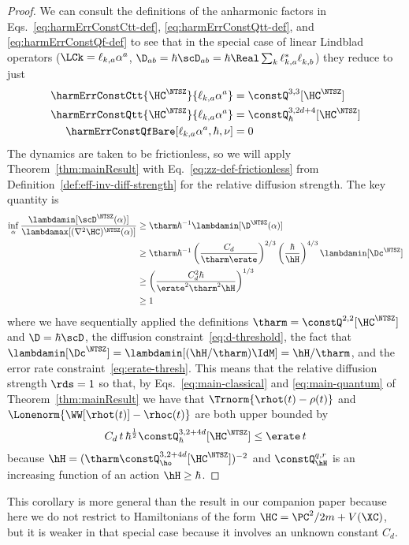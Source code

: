 \documentclass{article}
\numberwithin{equation}{section}
\begin{document}
\begin{proof}
    We can consult the definitions of the anharmonic factors in Eqs.~\eqref{eq:harmErrConstCtt-def}, \eqref{eq:harmErrConstQtt-def}, and \eqref{eq:harmErrConstQf-def} to see that in the special case of linear Lindblad operators ($\LCk = \ell_{k,a}\alpha^a$, $\D_{ab} =\hbar\scD_{ab}=  \hbar\Real \sum_k {\ell_{k,a}^*}{ \ell_{k,b}^{\phantom *}}$) they reduce to 
    just 
    \begin{align}
        \harmErrConstCtt{\HC^\NTSZ}{\ell_{k,a}\alpha^a} 
        &= 
         \constQ^{3,3}[\HC^\NTSZ]
        \\
        \harmErrConstQtt{\HC^\NTSZ}{\ell_{k,a}\alpha^a} 
        &= 
        \constQ^{3,2d+4}_\hbar[\HC^\NTSZ]
        \\
        \harmErrConstQfBare[\ell_{k,a}\alpha^a,\hbar,\nu] &= 
        0
    \end{align}
    The dynamics are taken to be frictionless, so we will apply Theorem~\ref{thm:mainResult} with 
    Eq.~\eqref{eq:zz-def-frictionless} from Definition~\ref{def:eff-inv-diff-strength} for the relative diffusion strength.  The key quantity is
    \begin{align}
        \inf_\alpha 
        \frac{\lambdamin[\scD^\NTSZ(\alpha)]}{\lambdamax[(\nabla^2\HC)^\NTSZ(\alpha)]}
        & \ge 
        \tharm \hbar^{-1} \lambdamin[\D^\NTSZ(\alpha)]
        \\
        \label{johnny1}
        & \ge 
        \tharm \hbar^{-1} \left(\frac{C_d}{\tharm\erate}\right)^{2/3}
        \left(\frac{\hbar}{\hH}\right)^{4/3} \lambdamin[\Dc^\NTSZ]
        \\
        \label{johnny3}
        & \ge 
        \left(\frac{C_d^2\hbar}{\erate^2 \tharm^2\hH}\right)^{1/3} \\
        \label{johnny4}
        & \ge 1 
    \end{align}
    where we have sequentially applied the definitions 
    $\tharm=\constQ^{2,2}[\HC^\NTSZ]$ and $\D=\hbar\scD$,
    the diffusion constraint~\eqref{eq:d-threshold},  the fact that $\lambdamin[\Dc^\NTSZ] = \lambdamin[(\hH/\tharm)\IdM] = \hH/\tharm$, and the error rate constraint~\eqref{eq:erate-thresh}.  This means that the relative diffusion strength $\rds=1$ so that, by Eqs.~\eqref{eq:main-classical} and \eqref{eq:main-quantum} of Theorem~\ref{thm:mainResult} we have that $\Trnorm{\rhot(t)-\rho(t)}$ and $\Lonenorm{\WW[\rhot(t)]-\rhoc(t)}$ are both upper bounded by
    \begin{align}
        C_d \, t\, \hbar^{\frac12} \constQ^{3,2+4d}_\hbar[\HC^\NTSZ] \le \erate \, t
    \end{align}
    because $\hH = (\tharm \constQ^{3,2+4d}_{\ho}[\HC^\NTSZ])^{-2}$ and $\constQ^{q,r}_{\hH}$ is an increasing function of an action $\hH \ge \hbar$.
\end{proof}
This corollary is more general than the result in our companion paper \cite{hernandez2023decoherence1} because here we do not restrict to Hamiltonians of the form $\HC = \PC^2/2m+V(\XC)$, but it is weaker in that special case because it involves an unknown constant $C_d$.
\end{document}
